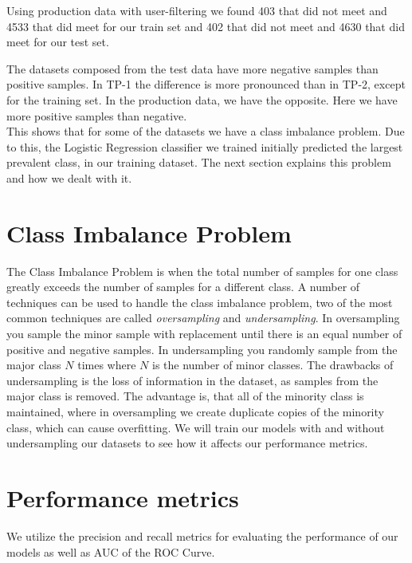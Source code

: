 Using production data with user-filtering we found 403 that did not meet and 4533 that did meet for our train set and 402 that did not meet and 4630 that did meet for our test set.

The datasets composed from the test data have more negative samples than positive samples. In TP-1 the difference is more pronounced than in TP-2, except for the training set. In the production data, we have the opposite. Here we have more positive samples than negative. \\
This shows that for some of the datasets we have a class imbalance problem. Due to this, the Logistic Regression classifier we trained initially predicted the largest prevalent class, in our training dataset. The next section explains this problem and how we dealt with it. 


\section{Class Imbalance Problem}
\label{sec:class_imbalance_problem}
The Class Imbalance Problem is when the total number of samples for one class greatly exceeds the number of samples for a different class. A number of techniques can be used to handle the class imbalance problem, two of the most common techniques are called \textit{oversampling} and \textit{undersampling}\cite{tan2006introduction}. In oversampling you sample the minor sample with replacement until there is an equal number of positive and negative samples. In undersampling you randomly sample from the major class $N$ times where $N$ is the number of minor classes. The drawbacks of undersampling is the loss of information in the dataset, as samples from the major class is removed. The advantage is, that all of the minority class is maintained, where in oversampling we create duplicate copies of the minority class, which can cause overfitting.
We will train our models with and without undersampling our datasets to see how it affects our performance metrics.

\section{Performance metrics}
\label{sec:performance_metrics}
We utilize the precision and recall metrics for evaluating the performance of our models as well as AUC of the ROC Curve.

